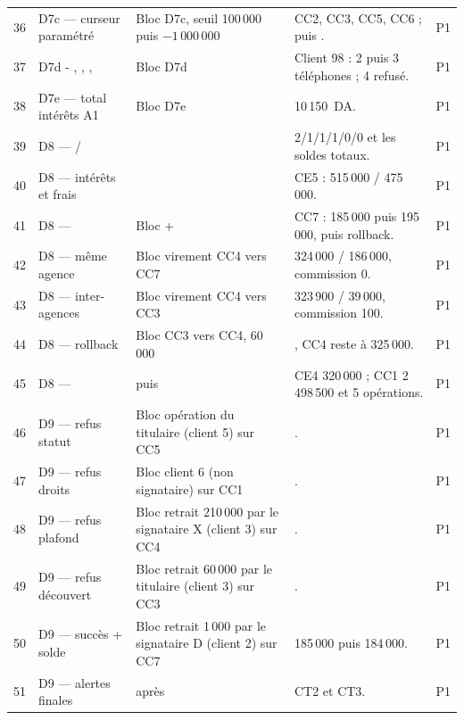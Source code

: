 {\begin{longtable}{@{}C{0.7cm}L{3.2cm}L{5.4cm}L{4.3cm}C{0.9cm}@{}}
36 & D7c — curseur paramétré & Bloc D7c, seuil 100\,000 puis
$-1\,000\,000$ &
CC2, CC3, CC5, CC6 ; puis . & P1 \\
37 & D7d - , , ,  & Bloc D7d &
Client 98 : 2 puis 3 téléphones ; 4 refusé. & P1 \\
38 & D7e — total intérêts A1 & Bloc D7e &
10\,150~DA. & P1 \\
39 & D8 —  /  &
 &
2/1/1/1/0/0 et les soldes totaux. & P1 \\
40 & D8 — intérêts et frais &
 &
CE5 : 515\,000 / 475\,000. & P1 \\
41 & D8 —  & Bloc  +  &
CC7 : 185\,000 puis 195\,000, puis rollback. & P1 \\
42 & D8 —  même agence & Bloc virement CC4 vers CC7 &
324\,000 / 186\,000, commission 0. & P1 \\
43 & D8 —  inter-agences & Bloc virement CC4 vers CC3 &
323\,900 / 39\,000, commission 100. & P1 \\
44 & D8 —  rollback & Bloc CC3 vers CC4, 60\,000 &
, CC4 reste à 325\,000. & P1 \\
45 & D8 —  &
 puis  &
CE4 320\,000 ; CC1 2\,498\,500 et 5 opérations. & P1 \\
46 & D9 — refus statut & Bloc opération du titulaire (client 5) sur CC5 &
. & P1 \\
47 & D9 — refus droits & Bloc client 6 (non signataire) sur CC1 &
. & P1 \\
48 & D9 — refus plafond & Bloc retrait 210\,000 par le signataire X (client 3)
sur CC4 & . & P1 \\
49 & D9 — refus découvert & Bloc retrait 60\,000 par le titulaire (client 3)
sur CC3 & . & P1 \\
50 & D9 — succès + solde & Bloc retrait 1\,000 par le signataire D (client 2)
sur CC7 & 185\,000 puis 184\,000. & P1 \\
51 & D9 — alertes finales &  après
 &
 CT2 et  CT3. & P1 \\

\end{longtable}}
